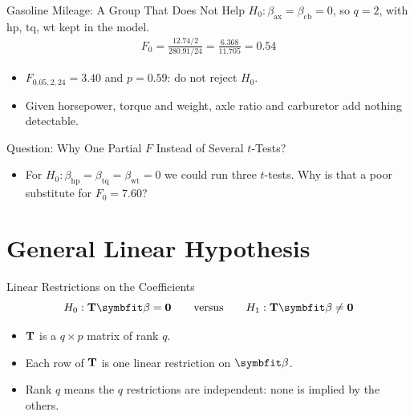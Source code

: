 \begin{frame}{Gasoline Mileage: A Group That Does Not Help}
    $H_0:\beta_{\mathrm{ax}}=\beta_{\mathrm{cb}}=0$, so $q=2$, with hp, tq, wt kept in the model.
    \begin{align*}
        F_0 = \frac{12.74/2}{280.91/24} = \frac{6.368}{11.705} = 0.54
    \end{align*}
    \begin{itemize}
        \item $F_{0.05,2,24}=3.40$ and $p=0.59$: do not reject $H_0$.
        \item Given horsepower, torque and weight, axle ratio and carburetor add nothing detectable.
    \end{itemize}
\end{frame}


\begin{frame}{Question: Why One Partial $F$ Instead of Several $t$-Tests?}
    \begin{itemize}
        \item For $H_0:\beta_{\mathrm{hp}}=\beta_{\mathrm{tq}}=\beta_{\mathrm{wt}}=0$ we could run three $t$-tests. Why is that a poor substitute for $F_0=7.60$?
    \end{itemize}
\end{frame}


\section{General Linear Hypothesis}


\begin{frame}{Linear Restrictions on the Coefficients}
    \[
    H_0:\bT\bbeta=\bzero
    \qquad\text{versus}\qquad
    H_1:\bT\bbeta\neq\bzero
    \]
    \begin{itemize}
        \item $\mathbf{T}$ is a $q\times p$ matrix of rank $q$.
        \item Each row of $\mathbf{T}$ is one linear restriction on $\bbeta$.
        \item Rank $q$ means the $q$ restrictions are independent: none is implied by the others.
    \end{itemize}
\end{frame}


